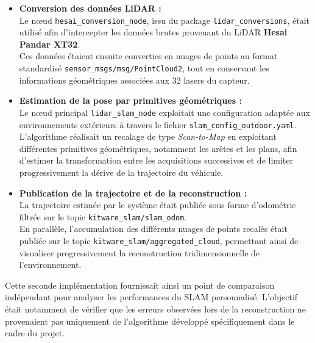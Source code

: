 \documentclass[12pt,a4paper,oneside]{report}
\begin{document}
\begin{itemize}[itemsep=0.5em]

\item \textbf{Conversion des données LiDAR :}\\
Le nœud \texttt{hesai\_conversion\_node}, issu du package \texttt{lidar\_conversions}, était utilisé afin d'intercepter les données brutes provenant du LiDAR \textbf{Hesai Pandar XT32}.\\
Ces données étaient ensuite converties en nuages de points au format standardisé \texttt{sensor\_msgs/msg/PointCloud2}, tout en conservant les informations géométriques associées aux 32 lasers du capteur.

\item \textbf{Estimation de la pose par primitives géométriques :}\\
Le nœud principal \texttt{lidar\_slam\_node} exploitait une configuration adaptée aux environnements extérieurs à travers le fichier \texttt{slam\_config\_outdoor.yaml}.\\
L'algorithme réalisait un recalage de type \textit{Scan-to-Map} en exploitant différentes primitives géométriques, notamment les arêtes et les plans, afin d'estimer la transformation entre les acquisitions successives et de limiter progressivement la dérive de la trajectoire du véhicule.

\item \textbf{Publication de la trajectoire et de la reconstruction :}\\
La trajectoire estimée par le système était publiée sous forme d'odométrie filtrée sur le topic \texttt{kitware\_slam/slam\_odom}.\\
En parallèle, l'accumulation des différents nuages de points recalés était publiée sur le topic \texttt{kitware\_slam/aggregated\_cloud}, permettant ainsi de visualiser progressivement la reconstruction tridimensionnelle de l'environnement.

\end{itemize}

\hspace*{.3cm}Cette seconde implémentation fournissait ainsi un point de comparaison indépendant pour analyser les performances du SLAM personnalisé. L'objectif était notamment de vérifier que les erreurs observées lors de la reconstruction ne provenaient pas uniquement de l'algorithme développé spécifiquement dans le cadre du projet.

\par\bigskip
\par\bigskip
\end{document}
